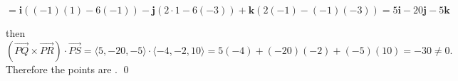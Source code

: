 \documentclass{article}
\theoremstyle{remark}
\begin{document}
\[
    =
    \mathbf{i}((-1)(1) - 6(-1))
    - \mathbf{j}(2 \cdot 1 - 6(-3))
    + \mathbf{k}(2(-1) - (-1)(-3))
    =
    5\mathbf{i} - 20\mathbf{j} - 5\mathbf{k}
\]

then
\[
    (\overrightarrow{PQ} \times \overrightarrow{PR}) \cdot \overrightarrow{PS}
    =
    \langle 5, -20, -5 \rangle \cdot \langle -4, -2, 10 \rangle
    = 5(-4) + (-20)(-2) + (-5)(10)
    = -30 \neq 0.
\]
Therefore the points are .
\qed

\vspace{1em}
\hrulefill
\end{document}
